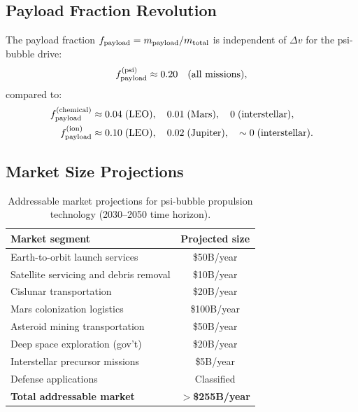 \documentclass[twocolumn,prl,superscriptaddress,nofootinbib,longbibliography,floatfix]{revtex4-2}
\begin{document}
\subsection{Payload Fraction Revolution}

The payload fraction $f_{\rm payload} = m_{\rm payload}/m_{\rm total}$
is independent of $\Delta v$ for the psi-bubble drive:
\begin{equation}
f_{\rm payload}^{\rm (psi)} \approx 0.20 \quad
\text{(all missions)},
\end{equation}
compared to:
\begin{align}
f_{\rm payload}^{\rm (chemical)} &\approx
0.04 \;\text{(LEO)},\quad
0.01 \;\text{(Mars)},\quad
0 \;\text{(interstellar)}, \\
f_{\rm payload}^{\rm (ion)} &\approx
0.10 \;\text{(LEO)},\quad
0.02 \;\text{(Jupiter)},\quad
\sim 0 \;\text{(interstellar)}.
\end{align}

\subsection{Market Size Projections}

\begin{table}[h]
\centering
\caption{Addressable market projections for psi-bubble propulsion
technology (2030--2050 time horizon).}
\label{tab:market}
\begin{ruledtabular}
\begin{tabular}{lc}
Market segment & Projected size \\
\hline
Earth-to-orbit launch services & \$50B/year \\
Satellite servicing and debris removal & \$10B/year \\
Cislunar transportation & \$20B/year \\
Mars colonization logistics & \$100B/year \\
Asteroid mining transportation & \$50B/year \\
Deep space exploration (gov't) & \$20B/year \\
Interstellar precursor missions & \$5B/year \\
Defense applications & Classified \\
\hline
\textbf{Total addressable market} & \textbf{$>$\$255B/year} \\
\end{tabular}
\end{ruledtabular}
\end{table}
\end{document}
